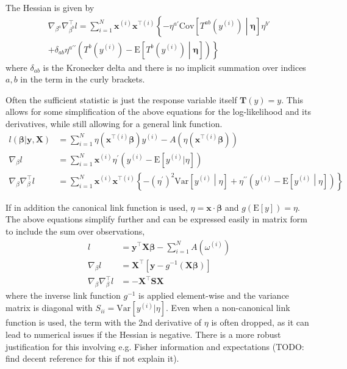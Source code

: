 \documentclass{article}
\newcommand{\bbeta}{\boldsymbol{\beta}}
\begin{document}
The Hessian is given by
\begin{multline}
	\nabla_{\beta^a} \nabla^\intercal_{\beta^b} l = \sum_{i=1}^N \mathbf{x}^{(i)}
	\mathbf{x}^{\intercal(i)} \left\{ - \eta^{a \prime}
	\textrm{Cov}\left[T^{ab}(y^{(i)}) \middle| \boldsymbol{\eta}\right] \eta^{b \prime} \right. \\
  + \left. \delta_{ab} \eta^{a\prime\prime}\left( T^b (y^{(i)}) -
	\textrm{E}\left[T^b(y^{(i)}) \middle| \boldsymbol{\eta} \right] \right) \right\}
\end{multline}
where \(\delta_{ab}\) is the Kronecker delta and there is no implicit
summation over indices \(a, b\) in the term in the curly brackets.

Often the sufficient statistic is just the response variable itself
\(\mathbf{T}(y) = y\). This allows for some simplification of the above
equations for the log-likelihood and its derivatives, while still allowing for a
general link function.
\begin{align}
	l(\bbeta | \mathbf{y}, \mathbf{X})        & = \sum_{i=1}^N
	\eta(\mathbf{x}^{\intercal(i)} \bbeta) y^{(i)} -
	A\left(\eta(\mathbf{x}^{\intercal(i)} \bbeta) \right)                                                      \\
	\nabla_{\beta} l                          & = \sum_{i=1}^N \mathbf{x}^{(i)} \eta^{\prime} \left( y^{(i)} -
	\textrm{E}[y^{(i)}|\eta] \right)                                                                           \\
	\nabla_{\beta} \nabla^\intercal_{\beta} l & = \sum_{i=1}^N \mathbf{x}^{(i)}
	\mathbf{x}^{\intercal(i)} \left\{ - (\eta^{\prime})^2 \textrm{Var}\left[y^{(i)}
		\middle| \eta\right] + \eta^{\prime\prime}\left( y^{(i)} -
	\textrm{E}\left[y^{(i)} \middle| \eta \right] \right) \right\}
\end{align}

If in addition the canonical link function is used, \(\eta = \mathbf{x} \cdot
\bbeta\) and \(g(\textrm{E}[y]) = \eta\). The above equations
simplify further and can be expressed easily in matrix form to include the sum
over observations,
\begin{align}
	l                                     & = \mathbf{y}^\intercal \mathbf{X} \bbeta - \sum_{i=1}^N
	A\left(\omega^{(i)} \right)                                                                                        \\
	\nabla_\beta l                        & = \mathbf{X}^\intercal \left[ \mathbf{y} - g^{-1}(\mathbf{X}\bbeta)\right] \\
	\nabla_\beta \nabla_\beta^\intercal l & = - \mathbf{X}^\intercal \mathbf{S} \mathbf{X}
\end{align}
where the inverse link function \(g^{-1}\) is applied element-wise and the
variance matrix is diagonal with \(S_{ii} = \textrm{Var}[y^{(i)}|\eta]\). Even
when a non-canonical link function is used, the term with the 2nd derivative of
\(\eta\) is often dropped, as it can lead to numerical issues if the Hessian is
negative. There is a more robust justification for this involving e.g. Fisher
information and expectations (TODO: find decent reference for this if not
explain it).
\end{document}
